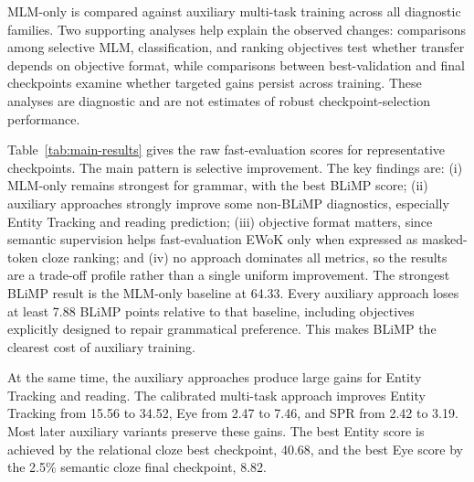 \documentclass[11pt]{article}
\begin{document}
MLM-only is compared against auxiliary multi-task training across all diagnostic families.
Two supporting analyses help explain the observed changes: comparisons among selective MLM, classification, and ranking objectives test whether transfer depends on objective format, while comparisons between best-validation and final checkpoints examine whether targeted gains persist across training.
These analyses are diagnostic and are not estimates of robust checkpoint-selection performance.



Table~\ref{tab:main-results} gives the raw fast-evaluation scores for representative checkpoints.
The main pattern is selective improvement.
The key findings are: (i) MLM-only remains strongest for grammar, with the best BLiMP score; (ii) auxiliary approaches strongly improve some non-BLiMP diagnostics, especially Entity Tracking and reading prediction; (iii) objective format matters, since semantic supervision helps fast-evaluation EWoK only when expressed as masked-token cloze ranking; and (iv) no approach dominates all metrics, so the results are a trade-off profile rather than a single uniform improvement.
The strongest BLiMP result is the MLM-only baseline at 64.33.
Every auxiliary approach loses at least 7.88 BLiMP points relative to that baseline, including objectives explicitly designed to repair grammatical preference.
This makes BLiMP the clearest cost of auxiliary training.

At the same time, the auxiliary approaches produce large gains for Entity Tracking and reading.
The calibrated multi-task approach improves Entity Tracking from 15.56 to 34.52, Eye from 2.47 to 7.46, and SPR from 2.42 to 3.19.
Most later auxiliary variants preserve these gains.
The best Entity score is achieved by the relational cloze best checkpoint, 40.68, and the best Eye score by the 2.5\% semantic cloze final checkpoint, 8.82.
\end{document}
